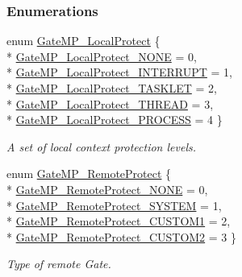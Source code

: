 \subsubsection*{Enumerations}
\begin{DoxyCompactItemize}
\item 
enum \hyperlink{_gate_m_p_8h_a3877bd64627d7449d3687e8b06939652}{Gate\-M\-P\-\_\-\-Local\-Protect} \{ \\*
\hyperlink{_gate_m_p_8h_a3877bd64627d7449d3687e8b06939652a4577e1162c081ed8019a349318ab3afe}{Gate\-M\-P\-\_\-\-Local\-Protect\-\_\-\-N\-O\-N\-E} =  0, 
\\*
\hyperlink{_gate_m_p_8h_a3877bd64627d7449d3687e8b06939652aa4c5dba40613d5436adb6c604bb8514f}{Gate\-M\-P\-\_\-\-Local\-Protect\-\_\-\-I\-N\-T\-E\-R\-R\-U\-P\-T} =  1, 
\\*
\hyperlink{_gate_m_p_8h_a3877bd64627d7449d3687e8b06939652aabb3d9eb4b679ceebb537775d388f2b1}{Gate\-M\-P\-\_\-\-Local\-Protect\-\_\-\-T\-A\-S\-K\-L\-E\-T} =  2, 
\\*
\hyperlink{_gate_m_p_8h_a3877bd64627d7449d3687e8b06939652a257bc8d4b8d6d19bdbe96cae37cbd908}{Gate\-M\-P\-\_\-\-Local\-Protect\-\_\-\-T\-H\-R\-E\-A\-D} =  3, 
\\*
\hyperlink{_gate_m_p_8h_a3877bd64627d7449d3687e8b06939652aeec868d37052043812bc4c1829319a6d}{Gate\-M\-P\-\_\-\-Local\-Protect\-\_\-\-P\-R\-O\-C\-E\-S\-S} =  4
 \}
\begin{DoxyCompactList}\small\item\em A set of local context protection levels. \end{DoxyCompactList}\item 
enum \hyperlink{_gate_m_p_8h_a88716d5706d8fa8c6a3b9a4f023ef1d8}{Gate\-M\-P\-\_\-\-Remote\-Protect} \{ \\*
\hyperlink{_gate_m_p_8h_a88716d5706d8fa8c6a3b9a4f023ef1d8a29b87b5258dbf5e387fc5a4ada3548ab}{Gate\-M\-P\-\_\-\-Remote\-Protect\-\_\-\-N\-O\-N\-E} =  0, 
\\*
\hyperlink{_gate_m_p_8h_a88716d5706d8fa8c6a3b9a4f023ef1d8aba4e153ee33cce1d32dc84254261c557}{Gate\-M\-P\-\_\-\-Remote\-Protect\-\_\-\-S\-Y\-S\-T\-E\-M} =  1, 
\\*
\hyperlink{_gate_m_p_8h_a88716d5706d8fa8c6a3b9a4f023ef1d8a2c1243e212dfe1dfce672b2d7556fd1d}{Gate\-M\-P\-\_\-\-Remote\-Protect\-\_\-\-C\-U\-S\-T\-O\-M1} =  2, 
\\*
\hyperlink{_gate_m_p_8h_a88716d5706d8fa8c6a3b9a4f023ef1d8a997afc6350b832a6829ee004786aa8db}{Gate\-M\-P\-\_\-\-Remote\-Protect\-\_\-\-C\-U\-S\-T\-O\-M2} =  3
 \}
\begin{DoxyCompactList}\small\item\em Type of remote Gate. \end{DoxyCompactList}\end{DoxyCompactItemize}
